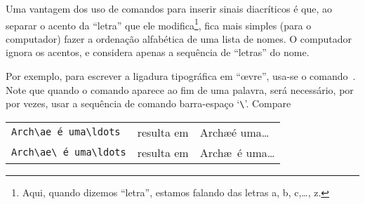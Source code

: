 \documentclass[article,openany]{memoir}
\newcommand*{\astt}[1]{%
  `\thinspace\texttt{#1}\thinspace'}
\newenvironment{exemplo}{\begin{center}}{\end{center}}
\begin{document}
Uma vantagem dos uso de comandos para inserir sinais diacríticos é
que, ao separar o acento da ``letra'' que ele modifica\footnote{Aqui,
  quando dizemos ``letra'', estamos falando das letras a, b, c,\ldots,
  z.}, fica mais simples (para o computador) fazer a ordenação
alfabética de uma lista de nomes. O computador ignora os acentos, e
considera apenas a sequência de ``letras'' do nome.

Por exemplo, para escrever a ligadura tipográfica em ``\oe vre'',
usa-se o comando~. Note que quando o comando aparece ao fim de
uma palavra, será necessário, por por vezes, usar a sequência de
comando barra-espaço \astt{\textbackslash\textvisiblespace}. Compare
\begin{exemplo}
\begin{tabular}{lll}
\verb/Arch\ae é uma\ldots/ & resulta em & Arch\ae é uma\ldots \\
\verb/Arch\ae\ é uma\ldots/ & resulta em & Arch\ae\ é uma\ldots
\end{tabular}
\end{exemplo}
\end{document}
